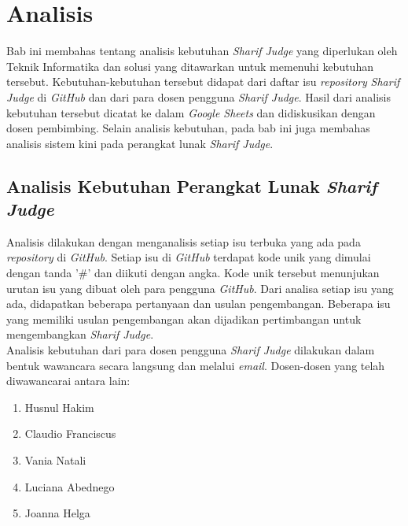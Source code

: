 \chapter{Analisis}
\label{chap:analisis}

Bab ini membahas tentang analisis kebutuhan \textit{Sharif Judge} yang diperlukan oleh Teknik Informatika dan solusi yang ditawarkan untuk memenuhi kebutuhan tersebut. Kebutuhan-kebutuhan tersebut didapat dari daftar isu \textit{repository} \textit{Sharif Judge} di \textit{GitHub} dan dari para dosen pengguna \textit{Sharif Judge}. Hasil dari analisis kebutuhan tersebut dicatat ke dalam \textit{Google Sheets} dan didiskusikan dengan dosen pembimbing. Selain analisis kebutuhan, pada bab ini juga membahas analisis sistem kini pada perangkat lunak \textit{Sharif Judge}.


\section{Analisis Kebutuhan Perangkat Lunak \textit{Sharif Judge}}
\label{sec:analisis}
Analisis dilakukan dengan menganalisis setiap isu terbuka yang ada pada \textit{repository} di \textit{GitHub}. Setiap isu di \textit{GitHub} terdapat kode unik yang dimulai dengan tanda '\#' dan diikuti dengan angka. Kode unik tersebut menunjukan urutan isu yang dibuat oleh para pengguna \textit{GitHub}. Dari analisa setiap isu yang ada, didapatkan beberapa pertanyaan dan usulan pengembangan. Beberapa isu yang memiliki usulan pengembangan akan dijadikan pertimbangan untuk mengembangkan \textit{Sharif Judge}. \\

Analisis kebutuhan dari para dosen pengguna \textit{Sharif Judge} dilakukan dalam bentuk wawancara secara langsung dan melalui \textit{email}. Dosen-dosen yang telah diwawancarai antara lain:
\begin{enumerate}
	\item Husnul Hakim
	\item Claudio Franciscus
	\item Vania Natali
	\item Luciana Abednego
	\item Joanna Helga
\end{enumerate}

